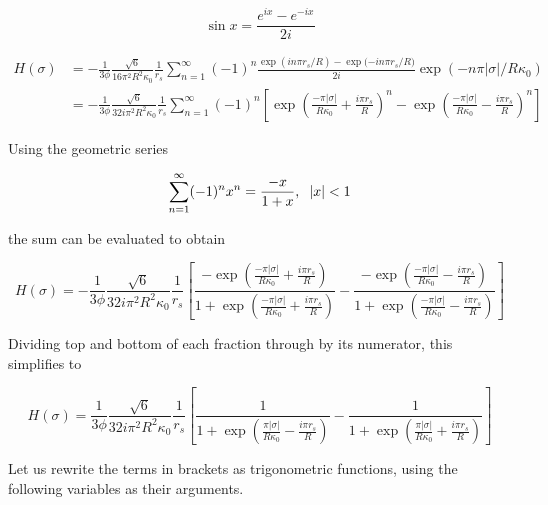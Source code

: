 \documentclass[onecolumn]{aastex63}
\begin{document}
\begin{equation}
    \sin{x} = \frac{e^{ix}-e^{-ix}}{2i}
\end{equation}

\begin{equation}
    \begin{split}
        H(\sigma) &= - \frac{1}{3 \phi} \frac{\sqrt{6}}{16 \pi^2 R^2 \kappa_0} \frac{1}{r_s} \sum_{n=1}^{\infty} (-1)^n \frac{\exp{(in\pi r_s / R)}-\exp{(-in\pi r_s/R})}{2i} \exp{(-n \pi |\sigma|/R\kappa_0)} \\
        &= - \frac{1}{3 \phi} \frac{\sqrt{6}}{32 i \pi^2 R^2 \kappa_0} \frac{1}{r_s} \sum_{n=1}^{\infty} (-1)^n \left[ \exp{\left(\frac{-\pi |\sigma|}{R\kappa_0} + \frac{i\pi r_s}{R}\right)^n}-\exp{\left(\frac{-\pi |\sigma|}{R\kappa_0} - \frac{i\pi r_s}{R}\right)^n}\right]
    \end{split}
\end{equation}

Using the geometric series

\begin{equation}
    \sum_{n=1}^{\infty}(-1)^nx^n = \frac{-x}{1+x}, \hspace{0.2cm} |x| < 1
\end{equation}

the sum can be evaluated to obtain

\begin{equation}
    H(\sigma) = - \frac{1}{3 \phi} \frac{\sqrt{6}}{32 i \pi^2 R^2 \kappa_0} \frac{1}{r_s} \left[\frac{-\exp{\left(\frac{-\pi |\sigma|}{R\kappa_0} + \frac{i\pi r_s}{R}\right)}}{1 + \exp{\left(\frac{-\pi |\sigma|}{R\kappa_0} + \frac{i\pi r_s}{R}\right)}}-\frac{-\exp{\left(\frac{-\pi |\sigma|}{R\kappa_0} - \frac{i\pi r_s}{R}\right)}}{1 + \exp{\left(\frac{-\pi |\sigma|}{R\kappa_0} - \frac{i\pi r_s}{R}\right)}}\right]
\end{equation}

Dividing top and bottom of each fraction through by its numerator, this simplifies to

\begin{equation} \label{before_trig}
    H(\sigma) = \frac{1}{3 \phi} \frac{\sqrt{6}}{32 i \pi^2 R^2 \kappa_0} \frac{1}{r_s} \left[\frac{1}{1 + \exp{\left(\frac{\pi |\sigma|}{R\kappa_0} - \frac{i\pi r_s}{R}\right)}}-\frac{1}{1 + \exp{\left(\frac{\pi |\sigma|}{R\kappa_0} + \frac{i\pi r_s}{R}\right)}}\right]
\end{equation}

Let us rewrite the terms in brackets as trigonometric functions, using the following variables as their arguments.
\end{document}
